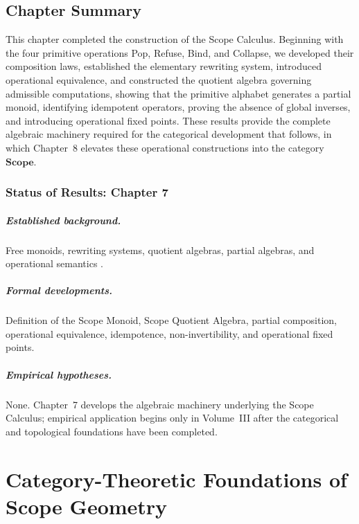 \documentclass[11pt,twoside,openright]{book}
\numberwithin{equation}{chapter}
\theoremstyle{definition}
\theoremstyle{plain}
\theoremstyle{remark}
\theoremstyle{definition}
\newcommand{\CatScope}{\mathbf{Scope}}
\begin{document}
\section{Chapter Summary}

This chapter completed the construction of the Scope Calculus. Beginning
with the four primitive operations Pop, Refuse, Bind, and Collapse, we
developed their composition laws, established the elementary rewriting
system, introduced operational equivalence, and constructed the quotient
algebra governing admissible computations, showing that the primitive
alphabet generates a partial monoid, identifying idempotent operators,
proving the absence of global inverses, and introducing operational fixed
points. These results provide the complete algebraic machinery required
for the categorical development that follows, in which Chapter~8 elevates
these operational constructions into the category $\CatScope$.

\subsection*{Status of Results: Chapter 7}

\paragraph{Established background.} Free monoids, rewriting systems,
quotient algebras, partial algebras, and operational semantics
\cite{Hopcroft2006,Baader1998,MacLane1998}.

\paragraph{Formal developments.} Definition of the Scope Monoid, Scope
Quotient Algebra, partial composition, operational equivalence,
idempotence, non-invertibility, and operational fixed points.

\paragraph{Empirical hypotheses.} None. Chapter~7 develops the algebraic
machinery underlying the Scope Calculus; empirical application begins
only in Volume~III after the categorical and topological foundations have
been completed.

\chapter{Category-Theoretic Foundations of Scope Geometry}
\label{ch:category}
\end{document}
